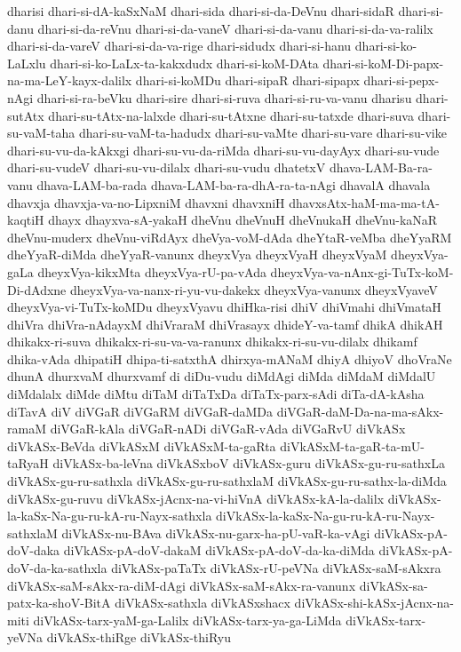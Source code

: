 {dharisi
dhari-si-dA-kaSxNaM
dhari-sida
dhari-si-da-DeVnu
dhari-sidaR
dhari-si-danu
dhari-si-da-reVnu
dhari-si-da-vaneV
dhari-si-da-vanu
dhari-si-da-va-ralilx
dhari-si-da-vareV
dhari-si-da-va-rige
dhari-sidudx
dhari-si-hanu
dhari-si-ko-LaLxlu
dhari-si-ko-LaLx-ta-kakxdudx
dhari-si-koM-DAta
dhari-si-koM-Di-papx-na-ma-LeY-kayx-dalilx
dhari-si-koMDu
dhari-sipaR
dhari-sipapx
dhari-si-pepx-nAgi
dhari-si-ra-beVku
dhari-sire
dhari-si-ruva
dhari-si-ru-va-vanu
dharisu
dhari-sutAtx
dhari-su-tAtx-na-lalxde
dhari-su-tAtxne
dhari-su-tatxde
dhari-suva
dhari-su-vaM-taha
dhari-su-vaM-ta-hadudx
dhari-su-vaMte
dhari-su-vare
dhari-su-vike
dhari-su-vu-da-kAkxgi
dhari-su-vu-da-riMda
dhari-su-vu-dayAyx
dhari-su-vude
dhari-su-vudeV
dhari-su-vu-dilalx
dhari-su-vudu
dhatetxV
dhava-LAM-Ba-ra-vanu
dhava-LAM-ba-rada
dhava-LAM-ba-ra-dhA-ra-ta-nAgi
dhavalA
dhavala
dhavxja
dhavxja-va-no-LipxniM
dhavxni
dhavxniH
dhavxsAtx-haM-ma-ma-tA-kaqtiH
dhayx
dhayxva-sA-yakaH
dheVnu
dheVnuH
dheVnukaH
dheVnu-kaNaR
dheVnu-muderx
dheVnu-viRdAyx
dheVya-voM-dAda
dheYtaR-veMba
dheYyaRM
dheYyaR-diMda
dheYyaR-vanunx
dheyxVya
dheyxVyaH
dheyxVyaM
dheyxVya-gaLa
dheyxVya-kikxMta
dheyxVya-rU-pa-vAda
dheyxVya-va-nAnx-gi-TuTx-koM-Di-dAdxne
dheyxVya-va-nanx-ri-yu-vu-dakekx
dheyxVya-vanunx
dheyxVyaveV
dheyxVya-vi-TuTx-koMDu
dheyxVyavu
dhiHka-risi
dhiV
dhiVmahi
dhiVmataH
dhiVra
dhiVra-nAdayxM
dhiVraraM
dhiVrasayx
dhideY-va-tamf
dhikA
dhikAH
dhikakx-ri-suva
dhikakx-ri-su-va-va-ranunx
dhikakx-ri-su-vu-dilalx
dhikamf
dhika-vAda
dhipatiH
dhipa-ti-satxthA
dhirxya-mANaM
dhiyA
dhiyoV
dhoVraNe
dhunA
dhurxvaM
dhurxvamf
di
diDu-vudu
diMdAgi
diMda
diMdaM
diMdalU
diMdalalx
diMde
diMtu
diTaM
diTaTxDa
diTaTx-parx-sAdi
diTa-dA-kAsha
diTavA
diV
diVGaR
diVGaRM
diVGaR-daMDa
diVGaR-daM-Da-na-ma-sAkx-ramaM
diVGaR-kAla
diVGaR-nADi
diVGaR-vAda
diVGaRvU
diVkASx
diVkASx-BeVda
diVkASxM
diVkASxM-ta-gaRta
diVkASxM-ta-gaR-ta-mU-taRyaH
diVkASx-ba-leVna
diVkASxboV
diVkASx-guru
diVkASx-gu-ru-sathxLa
diVkASx-gu-ru-sathxla
diVkASx-gu-ru-sathxlaM
diVkASx-gu-ru-sathx-la-diMda
diVkASx-gu-ruvu
diVkASx-jAcnx-na-vi-hiVnA
diVkASx-kA-la-dalilx
diVkASx-la-kaSx-Na-gu-ru-kA-ru-Nayx-sathxla
diVkASx-la-kaSx-Na-gu-ru-kA-ru-Nayx-sathxlaM
diVkASx-nu-BAva
diVkASx-nu-garx-ha-pU-vaR-ka-vAgi
diVkASx-pA-doV-daka
diVkASx-pA-doV-dakaM
diVkASx-pA-doV-da-ka-diMda
diVkASx-pA-doV-da-ka-sathxla
diVkASx-paTaTx
diVkASx-rU-peVNa
diVkASx-saM-sAkxra
diVkASx-saM-sAkx-ra-diM-dAgi
diVkASx-saM-sAkx-ra-vanunx
diVkASx-sa-patx-ka-shoV-BitA
diVkASx-sathxla
diVkASxshacx
diVkASx-shi-kASx-jAcnx-na-miti
diVkASx-tarx-yaM-ga-Lalilx
diVkASx-tarx-ya-ga-LiMda
diVkASx-tarx-yeVNa
diVkASx-thiRge
diVkASx-thiRyu
}
